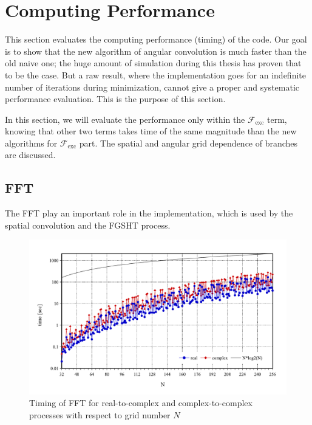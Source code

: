 
\chapter{Computing Performance \label{chpt:seq-code-performance}}

This section evaluates the computing performance (timing) of the code.
Our goal is to show that the new algorithm of angular convolution
is much faster than the old naive one; the huge amount of simulation
during this thesis has proven that to be the case. But a raw result,
where the implementation goes for an indefinite number of iterations
during minimization, cannot give a proper and systematic performance
evaluation. This is the purpose of this section.

In this section, we will evaluate the performance only within the
$\mathcal{F}_{\mathrm{exc}}$ term, knowing that other two terms takes
time of the same magnitude than the new algorithms for $\mathcal{F}_{\mathrm{exc}}$
part. The spatial and angular grid dependence of branches are discussed.

\section{FFT}

The \acs{FFT} play an important role in the implementation, which
is used by the spatial convolution and the \acs{FGSHT} process. 

\begin{figure}[H]
\begin{centering}
\includegraphics[bb=0bp 20bp 567bp 310bp,width=1\columnwidth]{_figure/results/fftw_timing}
\par\end{centering}
\caption{Timing of \acs{FFT} for real-to-complex and complex-to-complex processes
with respect to grid number $N$\label{fig:timing-FFT}}
\end{figure}

